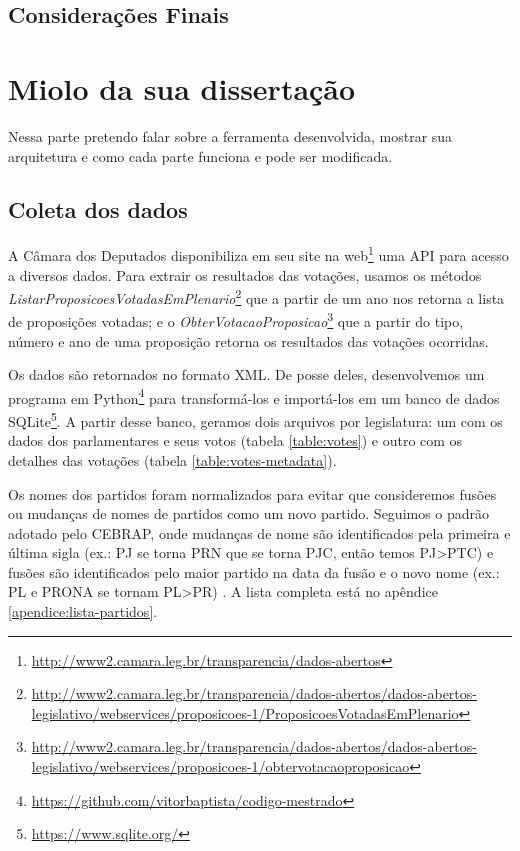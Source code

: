 \documentclass[a4paper,titlepage]{ppgi}\usepackage[]{graphicx}\usepackage[]{color}
\begin{document}
\section{Considerações Finais}









\chapter{Miolo da sua dissertação}\label{cap:miolo}

Nessa parte pretendo falar sobre a ferramenta desenvolvida, mostrar sua arquitetura e como cada parte funciona e pode ser modificada.

\section{Coleta dos dados}

A Câmara dos Deputados disponibiliza em seu site na
web\footnote{\url{http://www2.camara.leg.br/transparencia/dados-abertos}} uma
\gls{API} para acesso a diversos dados. Para extrair os resultados das
votações, usamos os métodos
\emph{ListarProposicoesVotadasEmPlenario}\footnote{\url{http://www2.camara.leg.br/transparencia/dados-abertos/dados-abertos-legislativo/webservices/proposicoes-1/ProposicoesVotadasEmPlenario}}
que a partir de um ano nos retorna a lista de proposições votadas; e o
\emph{ObterVotacaoProposicao}\footnote{\url{http://www2.camara.leg.br/transparencia/dados-abertos/dados-abertos-legislativo/webservices/proposicoes-1/obtervotacaoproposicao}}
que a partir do tipo, número e ano de uma proposição retorna os resultados das
votações ocorridas.  

Os dados são retornados no formato \gls{XML}. De posse deles, desenvolvemos um
programa em
Python\footnote{\url{https://github.com/vitorbaptista/codigo-mestrado}} para
transformá-los e importá-los em um banco de dados
SQLite\footnote{\url{https://www.sqlite.org/}}. A partir desse banco, geramos
dois arquivos por legislatura: um com os dados dos parlamentares e seus votos
(tabela \ref{table:votes}) e outro com os detalhes das votações (tabela
\ref{table:votes-metadata}).

Os nomes dos partidos foram normalizados para evitar que consideremos fusões ou
mudanças de nomes de partidos como um novo partido. Seguimos o padrão adotado
pelo \gls{CEBRAP}, onde mudanças de nome são identificados pela primeira e
última sigla (ex.: PJ se torna PRN que se torna PJC, então temos PJ>PTC) e
fusões são identificados pelo maior partido na data da fusão e o novo nome
(ex.: PL e PRONA se tornam PL>PR) \cite{Freitas2008}. A lista completa está no
apêndice \ref{apendice:lista-partidos}.
\end{document}
